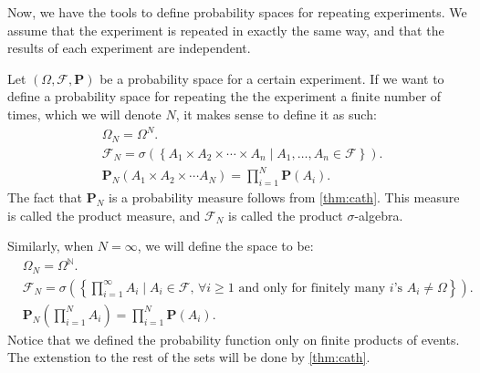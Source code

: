 \documentclass[11pt,a4paper]{article}
\theoremstyle{definition}
\theoremstyle{plain}
\newcommand{\N}{\mathbb{N}}
\newcommand{\Prob}{\mathbf{P}}
\newcommand{\set}[2]{ \left\{ #1 \mid #2 \right\} }
\begin{document}
  Now, we have the tools to define probability spaces for repeating experiments.
  We assume that the experiment is repeated in exactly the same way, and that
  the results of each experiment are independent.

  Let $(\Omega, \mathcal F, \Prob)$ be a probability space for a certain
  experiment. If we want to define a probability space for repeating the
  the experiment a finite number of times, which we will denote $N$, it makes
  sense to define it as such:
  \begin{align*}
    &\Omega_N = \Omega^N. \\
    &\mathcal F_N = \sigma\left(\set{A_1 \times A_2 \times \cdots \times A_n}
    {A_1,\dots,A_n \in \mathcal F}\right). \\
    &\Prob_N\left(A_1 \times A_2 \times \cdots A_N\right) = 
    \prod_{i=1}^{N} \Prob(A_i).
  \end{align*}
  The fact that $\Prob_N$ is a probability measure follows from 
  \autoref{thm:cath}. This measure is called the product measure, and 
  $\mathcal F_N$ is called the product $\sigma$-algebra.

  Similarly, when $N=\infty$, we will define the space to be:
  \begin{align*}
    &\Omega_N = \Omega^{\N}. \\
    &\mathcal F_N = \sigma\left(\set{\prod_{i=1}^{\infty}{A_i}}
    {A_i \in \mathcal F, \, \forall i \geq 1 \text{ and only for finitely many
    $i$'s } A_i \neq \Omega}\right). \\
    &\Prob_N\left(\prod_{i=1}^{N}{A_i}\right) = 
    \prod_{i=1}^{N} \Prob(A_i).
  \end{align*}
  Notice that we defined the probability function only on finite products of
  events. The extenstion to the rest of the sets will be done by 
  \autoref{thm:cath}.
\end{document}

